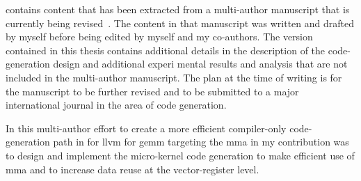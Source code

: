 \documentclass[\main/thesis.tex]{subfiles}
\begin{document}
\begin{preface}

 contains content that has been extracted from a multi-author manuscript that is currently being revised~\autocite{kuzma2021fast}.
The content in that manuscript was written and drafted by myself before being edited by myself and my co-authors.
The version contained in this thesis contains additional details in the description of the code-generation design and additional experi mental results and analysis that are not included in the multi-author manuscript.
The plan at the time of writing is for the manuscript to be further revised and to be submitted to a major international journal in the area of code generation.

In this multi-author effort to create a more efficient compiler-only code-generation path in  for \gls{llvm} for \Gls{gemm} targeting the \gls{mma} in  my contribution was to design and implement the micro-kernel code generation to make efficient use of \gls{mma} and to increase data reuse at the vector-register level.

%
%
\end{preface}
\end{document}
